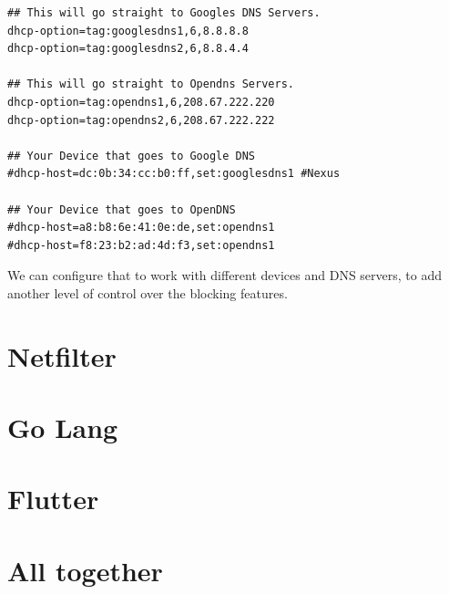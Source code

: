 \begin{lstlisting}
## This will go straight to Googles DNS Servers.
dhcp-option=tag:googlesdns1,6,8.8.8.8
dhcp-option=tag:googlesdns2,6,8.8.4.4

## This will go straight to Opendns Servers.
dhcp-option=tag:opendns1,6,208.67.222.220
dhcp-option=tag:opendns2,6,208.67.222.222

## Your Device that goes to Google DNS
#dhcp-host=dc:0b:34:cc:b0:ff,set:googlesdns1 #Nexus

## Your Device that goes to OpenDNS
#dhcp-host=a8:b8:6e:41:0e:de,set:opendns1
#dhcp-host=f8:23:b2:ad:4d:f3,set:opendns1
\end{lstlisting}

We can configure that to work with different devices and DNS servers, to add another level of control over the blocking features. \cite{archwikiDnsmasq}

\section{Netfilter}

\section{Go Lang}

\section{Flutter}

\section{All together}

